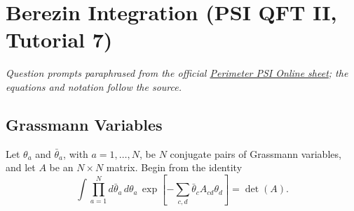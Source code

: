 \section{Berezin Integration (PSI QFT II, Tutorial 7)}

\noindent\textit{Question prompts paraphrased from the official
\href{https://psi-online.perimeterinstitute.ca/courses/take/quantum-field-theory-ii-student/pdfs/20776400-module-6-tutorial}{Perimeter PSI Online sheet};
the equations and notation follow the source.}

\subsection{Grassmann Variables}

Let $\theta_a$ and $\bar\theta_a$, with $a=1,\ldots,N$, be $N$ conjugate
pairs of Grassmann variables, and let $A$ be an $N\times N$ matrix. Begin
from the identity
\begin{equation}
    \int \prod_{a=1}^{N} d\bar\theta_a\,d\theta_a\,
    \exp\!\left[-\sum_{c,d}\bar\theta_c A_{cd}\theta_d\right]
    =\det(A).
\end{equation}

